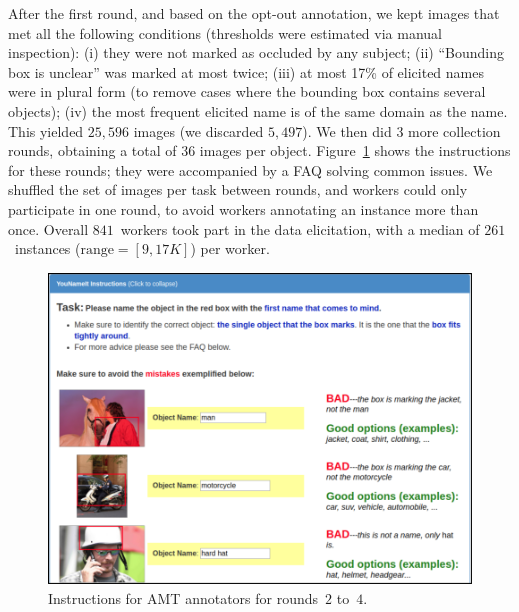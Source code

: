 After the first round, and based on the opt-out annotation, we kept images that met all the following conditions (thresholds were estimated via manual inspection): (i) they were not marked as occluded by any subject; (ii) ``Bounding box is unclear'' was marked at most twice; (iii) at most 17\% of elicited names were in plural form (to remove cases where the bounding box contains several objects); (iv) the most frequent elicited name is of the same domain as the \vg name.
This yielded $25,596$ images (we discarded $5,497$).
We then did 3 more collection rounds, obtaining a total of 36 images per object.
Figure~\ref{fig:instructions2} shows the instructions for these rounds; they were accompanied by a FAQ solving common issues. 
We shuffled the set of images per task between rounds, and workers could only participate in one round, to avoid workers annotating an instance more than once.
Overall $841$\ workers took part in the data elicitation, with a median of  $261$\ instances \mbox{($\textrm{range}=[9,17K]$)} per worker.

\begin{figure}[htp]
  \centering
  \includegraphics[width=1.5\columnwidth]{figures/round1+_p1.png}
  \caption{Instructions for AMT annotators for rounds~$2$ to~$4$.}%
  \label{fig:instructions2}
\end{figure}






